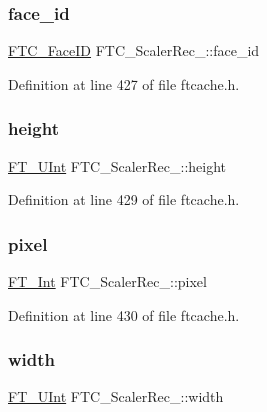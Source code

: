 \subsubsection{\texorpdfstring{face\_id}{face\_id}}
{\footnotesize\ttfamily \mbox{\hyperlink{ftcache_8h_a5da66c12c497bf5888638100876c7197}{F\+T\+C\+\_\+\+Face\+ID}} F\+T\+C\+\_\+\+Scaler\+Rec\+\_\+\+::face\+\_\+id}



Definition at line 427 of file ftcache.\+h.

\mbox{\label{struct_f_t_c___scaler_rec___a9b3a9b4d7148bbaa4daaae1e1fbb2dbc}} 
\subsubsection{\texorpdfstring{height}{height}}
{\footnotesize\ttfamily \mbox{\hyperlink{fttypes_8h_abcb8db4dbf35d2b55a9e8c7b0926dc52}{F\+T\+\_\+\+U\+Int}} F\+T\+C\+\_\+\+Scaler\+Rec\+\_\+\+::height}



Definition at line 429 of file ftcache.\+h.

\mbox{\label{struct_f_t_c___scaler_rec___ab78868341e2d66f17e6f1d77e9e054d2}} 
\subsubsection{\texorpdfstring{pixel}{pixel}}
{\footnotesize\ttfamily \mbox{\hyperlink{fttypes_8h_af90e5fb0d07e21be9fe6faa33f02484c}{F\+T\+\_\+\+Int}} F\+T\+C\+\_\+\+Scaler\+Rec\+\_\+\+::pixel}



Definition at line 430 of file ftcache.\+h.

\mbox{\label{struct_f_t_c___scaler_rec___a11e13d907ca4661bf7c1d98fffecf321}} 
\subsubsection{\texorpdfstring{width}{width}}
{\footnotesize\ttfamily \mbox{\hyperlink{fttypes_8h_abcb8db4dbf35d2b55a9e8c7b0926dc52}{F\+T\+\_\+\+U\+Int}} F\+T\+C\+\_\+\+Scaler\+Rec\+\_\+\+::width}



